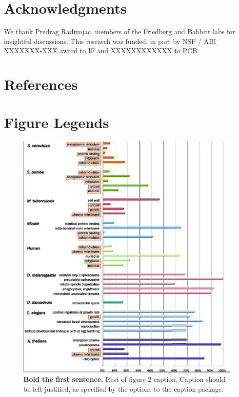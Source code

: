 \documentclass[12pt]{article}
\begin{document}
\section*{Acknowledgments}
We thank Predrag Radivojac, members of the Friedberg and Babbitt labs for insightful discussions.
This research was funded, in part by NSF / ABI XXXXXXX-XXX award to IF and XXXXXXXXXXXX to PCB.

\section*{References}


\section*{Figure Legends}

\begin{figure}[!ht]
\begin{center}
\includegraphics[width=6in]{rel-contrib.eps}
\end{center}
\caption{
{\bf Bold the first sentence.}  Rest of figure 2  caption.  Caption 
should be left justified, as specified by the options to the caption 
package.
}
\label{fig:rel-contrib}
\end{figure}
\end{document}
